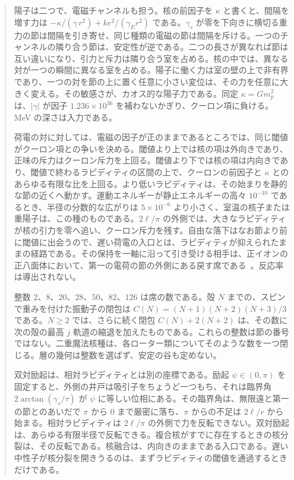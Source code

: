 \documentclass[a4paper]{article}
\begin{document}
\begin{abstract}
陽子は二つで、電磁チャンネルも担う。核の前因子を \(\kappa\) と書くと、間隔を増す力は \(-\kappa/(\gamma\,r^2)+k e^2/(\gamma_E r^2)\) である。\(\gamma_s\) が零を下向きに横切る重力の節は間隔を引き寄せ、同じ種類の電磁の節は間隔を斥ける。一つのチャンネルの隣り合う節は、安定性が逆である。二つの長さが異なれば節は互い違いになり、引力と斥力は隣り合う室を占める。核の中では、異なる対が一つの瞬間に異なる室を占める。陽子に働く力は室の壁の上で非有界であり、一つの対を節の上に置く任意に小さい変位は、その力を任意に大きく変える。その敏感さが、カオス的な陽子力である。同定 \(\kappa=G m_p^2\) は、\(|\gamma|\) が因子 \(1.236\times 10^{36}\) を補わないかぎり、クーロン項に負ける。MeV の深さは入力である。

荷電の対に対しては、電磁の因子が正のままであるところでは、同じ閾値がクーロン項との争いを決める。閾値より上では核の項は外向きであり、正味の斥力はクーロン斥力を上回る。閾値より下では核の項は内向きであり、閾値で終わるラピディティの区間の上で、クーロンの前因子と \(\kappa\) とのあらゆる有限な比を上回る。より低いラピディティは、その始まりを静的な節の近くへ動かす。運動エネルギーが静止エネルギーの高々 \(10^{-10}\) であるとき、半径の分数的な広がりは \(5\times 10^{-6}\) より小さく、室温の核子または重陽子は、この種のものである。\(2\ell/\pi\) の外側では、大きなラピディティが核の引力を零へ追い、クーロン斥力を残す。自由な落下はなお節より前に閾値に出会うので、遅い荷電の入口とは、ラピディティが抑えられたままの経路である。その保持を一軸に沿って引き受ける相手は、正イオンの正八面体において、第一の電荷の節の外側にある戻す席である~\cite{dst-cold}。反応率は導出されない。

整数 \(2\)、\(8\)、\(20\)、\(28\)、\(50\)、\(82\)、\(126\) は席の数である。殻 \(N\) までの、スピンで重みを付けた振動子の閉包は \(C(N)=(N+1)(N+2)(N+3)/3\) である。\(N\ge 2\) では、さらに続く閉包 \(C(N)+2(N+2)\) は、その数に次の殻の最高 \(j\) 軌道の縮退を加えたものである。これらの整数は節の番号ではない。二重魔法核種は、各ローター類についてそのような数を一つ閉じる。層の幾何は整数を選ばず、安定の谷も定めない。

双対励起は、相対ラピディティとは別の座標である。励起 \(\psi\in(0,\pi)\) を固定すると、外側の井戸は吸引子をちょうど一つもち、それは臨界角 \(2\arctan(\gamma_s/\tau)\) が \(\psi\) に等しい位相にある。その臨界角は、無限遠と第一の節とのあいだで \(\pi\) から \(0\) まで厳密に落ち、\(\pi\) からの不足は \(2\ell/r\) から始まる。相対ラピディティは \(2\ell/\pi\) の外側で力を反転できない。双対励起は、あらゆる有限半径で反転できる。複合核がすでに存在するときの核分裂は、その反転である。核融合は、内向きのままである入口である。遅い中性子が核分裂を開きうるのは、まずラピディティの閾値を通過するときだけである。
\end{abstract}
\end{document}
